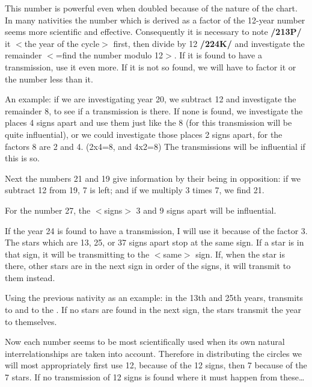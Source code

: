 This number is powerful even when doubled because of the nature of the chart. In many nativities the number which is derived as a factor of the 12-year number seems more scientific and effective. Consequently it is necessary to note \textbf{/213P/} it $<$the year of the cycle$>$ first, then divide by 12 \textbf{/224K/} and investigate the remainder $<$=find the number modulo 12$>$. If it is found to have a transmission, use it even more. If it is not so found, we will have to factor it or the number less than it. 

An example: if we are investigating year 20, we subtract 12 and investigate the remainder 8, to see if a transmission is there. If
none is found, we investigate the places 4 signs apart and use them just like the 8 (for this transmission will be quite influential), or we could investigate those places 2 signs apart, for the factors 8 are 2 and 4. (2x4=8, and 4x2=8) The transmissions will be influential if this is so.

Next the numbers 21 and 19 give information by their being in opposition: if we subtract 12 from 19, 7 is left; and if we multiply 3 times 7, we find 21. 

For the number 27, the $<$signs$>$ 3 and 9 signs apart will be influential. 

If the year 24 is found to have a transmission, I will use it because of the factor 3. The stars which are 13, 25, or 37 signs apart stop at the same sign. If a star is in that sign, it will be transmitting to the $<$same$>$ sign. If, when the star is there, other stars are in the next sign in order of the signs, it will transmit to them instead. 

Using the previous nativity as an example: in the 13th and 25th
years, \Mars\xspace transmits to \Jupiter\xspace and \Jupiter\xspace to the \Moon. If no stars are found in the next sign, the stars
transmit the year to themselves. 

Now each number seems to be most scientifically used when its own natural interrelationships are taken into account. Therefore in distributing the circles we will most appropriately first use 12, because of the 12 signs, then 7 because of the 7 stars. If no transmission of 12 signs is found where it must happen from these…

